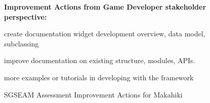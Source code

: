 \begin{figure}[ht!]
\begin{mybox}
\textbf{Improvement Actions from Game Developer stakeholder perspective:}
\begin{compactenum}
\item create documentation widget development overview, data model, subclassing
\item improve documentation on existing structure, modules, APIs.
\item more examples or tutorials in developing with the framework
\end{compactenum}

\end{mybox}
\caption{SGSEAM Assessment Improvement Actions for Makahiki}
\label{fig:assessment-action}  
\end{figure}
